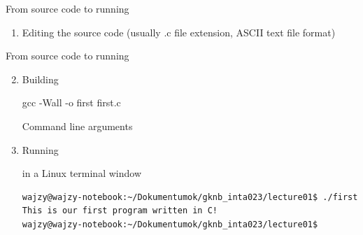 \documentclass[usenames,dvipsnames,aspectratio=169]{beamer}
\newcommand{\kiemel}[1]{{\color{kiemelesszin}#1}}
\begin{document}
\begin{frame}{From source code to running}
  \begin{enumerate}
      \item Editing the source code (usually \kiemel{.c} file extension, ASCII text file format)
    \end{enumerate}
    \begin{exampleblock}{}
      \footnotesize
      
    \end{exampleblock}
\end{frame}

\begin{frame}[fragile]{From source code to running}
  \begin{enumerate}
    \setcounter{enumi}{1}
    \item Building
      \begin{block}{}
        gcc -Wall -o first first.c
      \end{block}
      \small
      \begin{exampleblock}{Command line arguments}
      \end{exampleblock}
    \item Running
    \begin{block}{in a Linux terminal window}
      \scriptsize
      \begin{verbatim}
wajzy@wajzy-notebook:~/Dokumentumok/gknb_inta023/lecture01$ ./first 
This is our first program written in C!
wajzy@wajzy-notebook:~/Dokumentumok/gknb_inta023/lecture01$
\end{verbatim}
    \end{block}
  \end{enumerate}
\end{frame}
\end{document}
